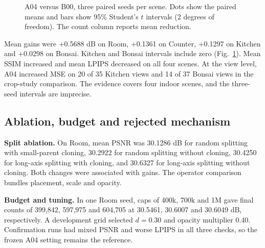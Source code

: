 \documentclass[11pt,a4paper]{article}
\begin{document}
\begin{figure}[!ht]
\centering
{}
\caption{A04 versus B00, three paired seeds per scene. Dots show the paired
means and bars show 95\% Student's $t$ intervals ($2$ degrees of freedom).
The count column reports mean reduction.}
\label{fig:seed-results}
\end{figure}

Mean gains were +0.5688 dB on Room, +0.1361 on Counter, +0.1297 on
Kitchen and +0.0298 on Bonsai. Kitchen and Bonsai intervals include zero
(Fig.~\ref{fig:seed-results}). Mean SSIM increased and mean LPIPS decreased on
all four scenes. At the view level, A04 increased MSE on 20 of 35 Kitchen
views and 14 of 37 Bonsai views in the crop-study comparison. The evidence
covers four indoor scenes, and the three-seed intervals are imprecise.

\subsection{Ablation, budget and rejected mechanism}
\textbf{Split ablation.} On Room, mean PSNR was 30.1286 dB for random
splitting with small-parent cloning, 30.2922 for random splitting without
cloning, 30.4250 for long-axis splitting with cloning, and 30.6327 for
long-axis splitting without cloning. Both changes were associated with
gains. The operator comparison bundles placement, scale and opacity.

\textbf{Budget and tuning.} In one Room seed, caps of 400k, 700k and 1M gave
final counts of 399,842, 597,975 and 604,705 at 30.5461, 30.6007 and
30.6049 dB, respectively. A development grid selected $d=0.30$ and opacity
multiplier 0.40. Confirmation runs had mixed PSNR and worse LPIPS in all
three checks, so the frozen A04 setting remains the reference.
\end{document}
